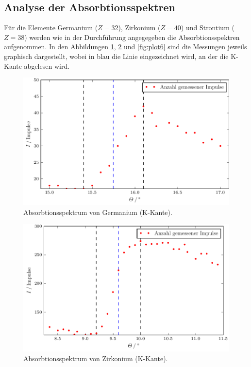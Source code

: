 \subsection{Analyse der Absorbtionsspektren}
Für die Elemente Germanium ($Z=32$), Zirkonium ($Z=40$) und Strontium ($Z=38$) werden wie in der Durchführung angegegeben die Absorbtionsspektren aufgenommen.
In den Abbildungen \ref{fig:plot4}, \ref{fig:plot5} und \ref{fig:plot6} sind die Messungen jeweils graphisch dargestellt, wobei in blau die Linie eingezeichnet wird, an der die K-Kante abgelesen wird.

\begin{figure}
  \centering
  \includegraphics{build/plot_ge.pdf}
  \caption{Absorbtionsspektrum von Germanium (K-Kante).}
  \label{fig:plot4}
\end{figure}

\begin{figure}
  \centering
  \includegraphics{build/plot_zr.pdf}
  \caption{Absorbtionsspektrum von Zirkonium (K-Kante).}
  \label{fig:plot5}
\end{figure}

